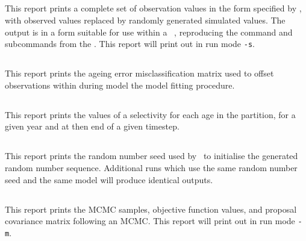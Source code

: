 \subsection{}

This report prints a complete set of observation values in the form specified by , with observed values replaced by randomly generated simulated values. The output is in a form  suitable for use within a \CNAME\ \config, reproducing the command and subcommands from the \config. This report will print out in run mode \texttt{-s}.

\subsection{}\label{sec:ageingerrorreport}

This report prints the ageing error misclassification matrix used to offset observations within during model the model fitting procedure.

\subsection{}

This report prints the values of a selectivity for each age in the partition, for a given year and at then end of a given timestep.

\subsection{}

This report prints the random number seed used by \CNAME\ to initialise the generated random number sequence. Additional runs which use the same random number seed and the same model will produce identical outputs.

\subsection{}

This report prints the MCMC samples, objective function values, and proposal covariance matrix following an MCMC. This report will print out in run mode \texttt{-m}.

